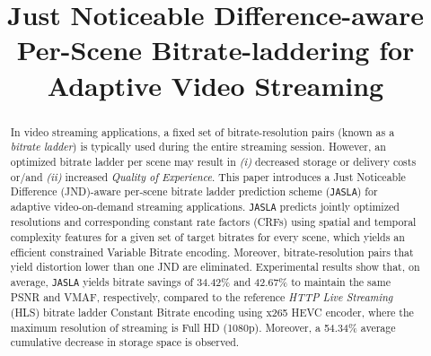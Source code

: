 \documentclass{article}
\newcommand{\VOD}{\emph{Video on Demand }}
\newcommand{\DCT}{\emph{Discrete Cosine Transform }}
\newcommand{\HLS}{\emph{HTTP Live Streaming }}
\newcommand{\QoE}{\emph{Quality of Experience}\xspace}
\newcommand{\jaslad}{\texttt{JASLA}\xspace}
\begin{document}
\title{Just Noticeable Difference-aware\\Per-Scene Bitrate-laddering for Adaptive Video Streaming}
\name{%
\begin{tabular}{@{}c@{}}
Vignesh V Menon$^1$ \qquad 
Jingwen Zhu$^2$ \qquad 
Prajit T Rajendran$^3$ \qquad  
Hadi Amirpour$^1$ \\
Patrick Le Callet$^{2}$ \qquad 
Christian Timmerer$^{1}$
\end{tabular}\vspace{-0.5em}}

\address{\small $^1$Christian Doppler Laboratory ATHENA, Alpen-Adria-Universit{\"a}t, Klagenfurt, Austria \\
\small $^2$Nantes Universite, Ecole Centrale Nantes, CAPACITES SAS, CNRS, LS2N, UMR 6004, F-44000 Nantes, France\\
\small $^3$CEA, List, F-91120 Palaiseau, Université Paris-Saclay, France
}

\maketitle

\begin{abstract}
In video streaming applications, a fixed set of bitrate-resolution pairs (known as a \textit{bitrate ladder}) is typically used during the entire streaming session. However, an optimized bitrate ladder per scene may result in \textit{(i)} decreased storage or delivery costs or/and \textit{(ii)} increased \QoE. This paper introduces a Just Noticeable Difference (JND)-aware per-scene bitrate ladder prediction scheme (\jaslad) for adaptive video-on-demand streaming applications. \jaslad predicts jointly optimized resolutions and corresponding constant rate factors (CRFs) using spatial and temporal complexity features for a given set of target bitrates for every scene, which yields an efficient constrained Variable Bitrate encoding. Moreover, bitrate-resolution pairs that yield distortion lower than one JND are eliminated. %
Experimental results show that, on average, \jaslad yields bitrate savings of 34.42\% and 42.67\% to maintain the same PSNR and VMAF, respectively, compared to the reference \HLS (HLS) bitrate ladder Constant Bitrate encoding using x265 HEVC encoder, where the maximum resolution of streaming is Full HD (1080p). Moreover, a 54.34\% average cumulative decrease in storage space is observed.
\end{abstract}
\end{document}
